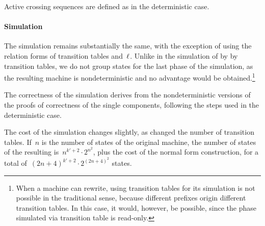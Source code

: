 Active crossing sequences are defined as in the deterministic case.

\paragraph{Simulation} The simulation remains substantially the same, with the exception of using the relation forms of transition tables and~$\ell$.
Unlike in the simulation of \TNFAs by \ODFAs by transition tables, we do not group states for the last phase of the simulation, as the resulting machine is nondeterministic and no advantage would be obtained.\footnote{%
	When a machine can rewrite, using transition tables for its simulation is not possible in the traditional sense, because different prefixes origin different transition tables.
	In this case, it would, however, be possible, since the phase simulated via transition table is read-only.}

The correctness of the simulation derives from the nondeterministic versions of the proofs of correctness of the single components, following the steps used in the deterministic case.

The cost of the simulation changes slightly, as changed the number of transition tables.
If~$n$ is the number of states of the original machine, the number of states of the resulting \ONFAs is~$n^{k'+2}\cdot2^{n^2}$, plus the cost of the normal form construction, for a total of~$(2n+4)^{k'+2}\cdot2^{(2n+4)^2}$ states.
